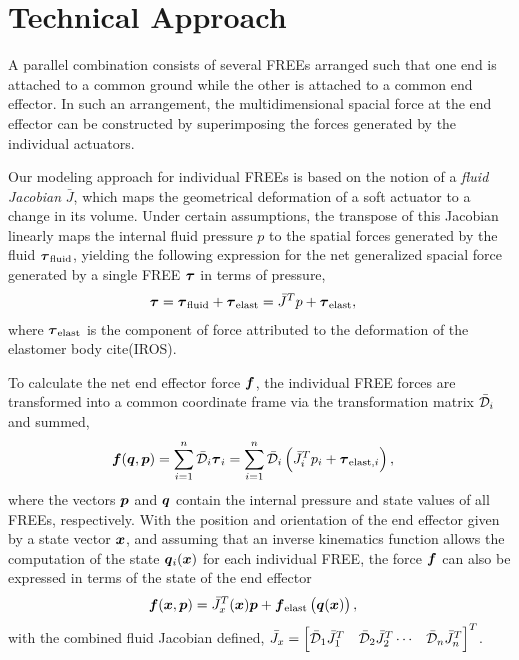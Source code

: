 \section{Technical Approach}    \label{sec:technical-approach}

A parallel combination consists of several FREEs arranged such that one end is attached to a common ground while the other is attached to a common end effector. In such an arrangement, the multidimensional spacial force at the end effector can be constructed by superimposing the forces generated by the individual actuators.

Our modeling approach for individual FREEs is based on the notion of a \emph{fluid Jacobian} $\bar{J}$, which maps the geometrical deformation of a soft actuator to a change in its volume. 
Under certain assumptions, the transpose of this Jacobian linearly maps the internal fluid pressure $p$ to the spatial forces generated by the fluid $\T_{\tx{fluid}}$, yielding the following expression for the net generalized spacial force generated by a single FREE $\T$ in terms of pressure,
\begin{align}
    \T &= \T_{\tx{fluid}} + \T_{\tx{elast}} = \J^T p + \T_{\tx{elast}} , 
\end{align}
where $\T_{\tx{elast}}$ is the component of force attributed to the deformation of the elastomer body cite(IROS).

To calculate the net end effector force $\f$, the individual FREE forces are transformed into a common coordinate frame via the transformation matrix $\bar{\mathcal{D}}_i$ and summed,
\begin{align}
    \f (\q, \p) &= \sum_{i=1}^n \D_i \T_i = \sum_{i=1}^n \D_i \left( \J_i^T p_i + \T_{\tx{elast}, i} \right),
\end{align}
where the vectors $\p$ and $\q$ contain the internal pressure and state values of all FREEs, respectively.
With the position and orientation of the end effector given by a state vector $\x$, and assuming that an inverse kinematics function allows the computation of the state $\q_i (\x)$ for each individual FREE, the force $\f$ can also be expressed in terms of the state of the end effector
\begin{align}
    \f (\x, \p) &= \J_x^T (\x) \p + \f_{\tx{elast}} \left( \q(\x) \right),
\end{align}
with the combined fluid Jacobian defined, $\bar{J}_x = \begin{bmatrix} \bar{\mathcal{D}}_1 \bar{J}_1^T & \bar{\mathcal{D}}_2 \bar{J}_2^T \cdots & \bar{\mathcal{D}}_n \bar{J}_n^T \end{bmatrix}^T$. 

